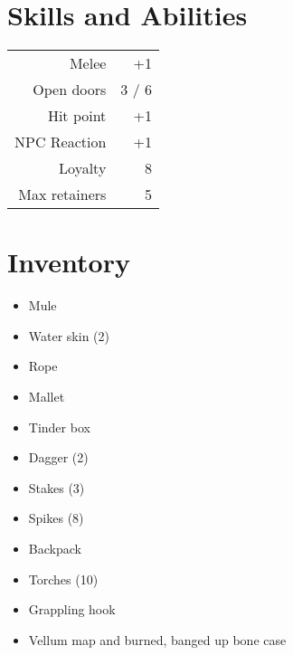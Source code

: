 \documentclass[a4paper]{article}
\begin{document}
\begin{multicols}{2}
\section{Skills and Abilities}
\begin{table}[H]
    \begin{tabular}{r|r} %
      Melee & +1\\
      Open doors & 3 / 6\\
      Hit point & +1\\
      NPC Reaction & +1\\
      Loyalty & 8\\
      Max retainers & 5\\
    \end{tabular}
\end{table}

\section{Inventory}
\begin{itemize}[nosep, itemindent=1em, label= ]
  \item Mule
  \item Water skin (2)
  \item Rope
  \item Mallet
  \item Tinder box
  \item Dagger (2)
  \item Stakes (3)
  \item Spikes (8)
  \item Backpack
  \item Torches (10)
  \item Grappling hook
  \item Vellum map and burned, banged up bone case
\end{itemize}


\end{multicols}
\end{document}
